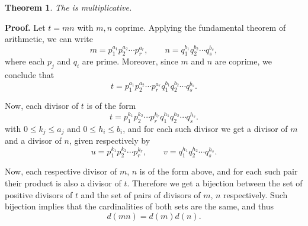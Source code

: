 \documentclass[12pt]{article}
\newtheorem*{thm*}{Theorem}
\begin{document}
\begin{thm*}
The  is multiplicative.
\end{thm*}

{\bf Proof.}
Let $t=mn$ with $m,n$ coprime.
Applying the fundamental theorem of arithmetic, we can write
\[
  m=p_1^{a_1}p_2^{a_2}\cdots p_{r}^{a_r},
  \qquad n=q_1^{b_1}q_2^{b_2}\cdots q_s^{b_s},
\]
where each $p_j$ and $q_i$ are prime.
Moreover, since $m$ and $n$ are coprime, we conclude that
\[
t=p_1^{a_1}p_2^{a_2}\cdots p_{r}^{a_r}q_1^{b_1}q_2^{b_2}\cdots q_s^{b_s}.
\]

Now, each divisor of $t$ is of the form
\[
t=p_1^{k_1}p_2^{k_2}\cdots p_{r}^{k_r}q_1^{h_1}q_2^{h_2}\cdots q_s^{h_s}.
\]
with $0\leq k_j\leq a_j$ and $0\leq h_i\leq b_i$,
and for each such divisor we get a divisor of $m$ and a divisor of $n$,
given respectively by
\[
  u=p_1^{k_1}p_2^{k_2}\cdots p_{r}^{k_r},
  \qquad v=q_1^{h_1}q_2^{h_2}\cdots q_s^{h_s}.
\]

Now, each respective divisor of $m$, $n$ is of the form above,
and for each such pair their product is also a divisor of $t$.
Therefore we get a bijection between the set of positive divisors of $t$
and the set of pairs of divisors of $m$, $n$ respectively.
Such bijection implies that the cardinalities of both sets are the same,
and thus
\[
  d(mn)=d(m)d(n).
\]
\end{document}
